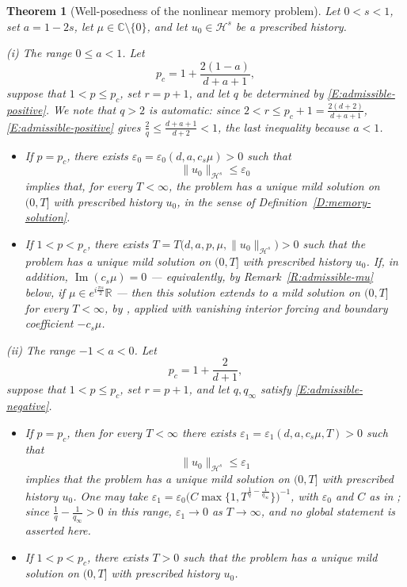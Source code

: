 \documentclass[11pt,letter]{amsart}
\def \R {\mathbb{R}}
\numberwithin{equation}{section}
\newcommand{\C}{\mathbb{C}}
\newtheorem{theorem}{Theorem}[section]
\numberwithin{equation}{section}
\begin{document}
\begin{theorem}[Well-posedness of the nonlinear memory problem]
\label{T:memory-wp}
Let $0<s<1$, set $a=1-2s$, let $\mu\in\C\setminus\{0\}$, and let
$u_0\in\mathcal H^s$ be a prescribed history.

\smallskip
\noindent\emph{(i) The range $0\le a<1$.} Let
\[
p_c=1+\frac{2(1-a)}{d+a+1},
\]
suppose that $1<p\leq p_c$, set $r=p+1$, and let $q$ be determined by
\eqref{E:admissible-positive}. We note that $q>2$ is automatic: since
$2<r\le p_c+1=\frac{2(d+2)}{d+a+1}$, \eqref{E:admissible-positive} gives
$\frac2q\le\frac{d+a+1}{d+2}<1$, the last inequality because $a<1$.
\begin{itemize}
\item[(a)] If $p=p_c$, there exists
$\varepsilon_0=\varepsilon_0(d,a,c_s\mu)>0$ such that
\[
\|u_0\|_{\mathcal H^s}\leq\varepsilon_0
\]
implies that, for every $T<\infty$, the problem has a unique mild solution on
$(0,T]$ with prescribed history $u_0$, in the sense of
Definition~\ref{D:memory-solution}.
\item[(b)] If $1<p<p_c$, there exists
$T=T\bigl(d,a,p,\mu,\|u_0\|_{\mathcal H^s}\bigr)>0$ such that the problem has a
unique mild solution on $(0,T]$ with prescribed history $u_0$. If, in addition,
$\operatorname{Im}(c_s\mu)=0$ --- equivalently, by
Remark~\ref{R:admissible-mu} below, if $\mu\in e^{i\frac{\pi s}{2}}\R$ --- then this
solution extends to a mild solution on $(0,T]$ for every $T<\infty$, by
\cite[Theorem~2.9(2)]{GS2}, applied with vanishing interior forcing and
boundary coefficient $-c_s\mu$.
\end{itemize}

\smallskip
\noindent\emph{(ii) The range $-1<a<0$.} Let
\[
p_c=1+\frac{2}{d+1},
\]
suppose that $1<p\leq p_c$, set $r=p+1$, and let $q,q_\infty$ satisfy
\eqref{E:admissible-negative}.
\begin{itemize}
\item[(a)] If $p=p_c$, then for every $T<\infty$ there exists
$\varepsilon_1=\varepsilon_1(d,a,c_s\mu,T)>0$ such that
\[
\|u_0\|_{\mathcal H^s}\leq\varepsilon_1
\]
implies that the problem has a unique mild solution on $(0,T]$ with prescribed
history $u_0$. One may take
$\varepsilon_1=\varepsilon_0\bigl(C\max\{1,T^{\frac1q-\frac1{q_\infty}}\}\bigr)^{-1}$,
with $\varepsilon_0$ and $C$ as in \cite[Theorem~2.10(1)]{GS2}; since
$\frac1q-\frac1{q_\infty}>0$ in this range, $\varepsilon_1\to0$ as
$T\to\infty$, and no global statement is asserted here.
\item[(b)] If $1<p<p_c$, there exists $T>0$ such that the problem has a unique
mild solution on $(0,T]$ with prescribed history $u_0$.
\end{itemize}


\end{theorem}
\end{document}
